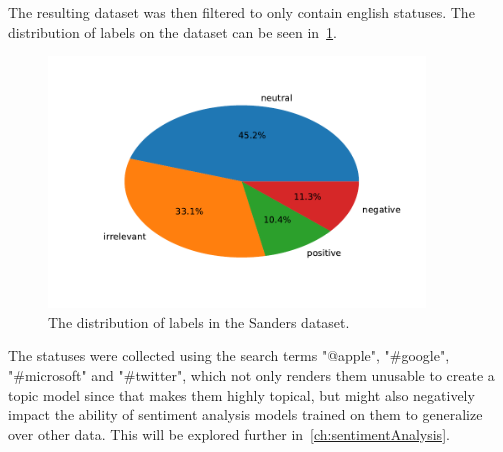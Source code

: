 \begin{table}
    \caption{Some fictional statuses with labels}
    \label{tab:sanders_sample}
\end{table}

The resulting dataset was then filtered to only contain english statuses.
The distribution of labels on the dataset can be seen in~\ref{fig:sanders_sentiment}.

\begin{figure}
    \centering
    \caption{The distribution of labels in the Sanders dataset.}
    \label{fig:sanders_sentiment}
    \includegraphics[width=10cm]{../figures/sanders_sentiment.pdf}
\end{figure}

The statuses were collected using the search terms "@apple", "\#google", "\#microsoft" and "\#twitter",
which not only renders them unusable to create a topic model since that makes them highly topical,
but might also negatively impact the ability of sentiment analysis models trained on them to generalize over other data.
This will be explored further in~\ref{ch:sentimentAnalysis}.

